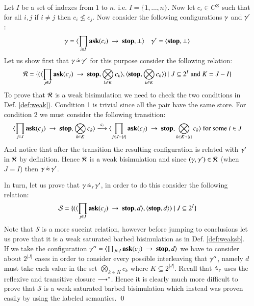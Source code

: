 \documentclass[main.tex]{subfiles}
\begin{document}
\begin{example}
\label{ex:barbvslabbis2}
Let $I$ be a set of indexes from $1$ to $n$, i.e. $I = \{1,\dots,n\}$. Now let $c_i \in C^\otimes$ such that
for all $i, j$ if $i \neq j$ then $c_i \not\leq c_j$. Now consider the following configurations $\gamma$ and $\gamma'$:
\[
\gamma = \langle \prod_{i \in I} {\bf ask}(c_i) \ \rightarrow \ \mbox{{\bf stop}},\bot \rangle \ \ \ \ \gamma' = \langle \mbox{{\bf stop}},\bot \rangle
\]
Let us show first that $\gamma\,\dot{\approx}\,\gamma'$ for this purpose consider the following relation:
\[
\mathcal{R} = \{ (\langle \prod_{j \in J} {\bf ask}(c_j) \ \rightarrow \ \mbox{{\bf stop}},\bigotimes_{k \in K} c_k \rangle, \langle \mbox{{\bf stop}},\bigotimes_{k \in K} c_k \rangle) 
\ |\  J \subseteq 2^I \mbox{ and } K = J - I\}
\]
To prove that $\mathcal{R}$ is a weak bisimulation we need to check the two conditions in Def. \ref{def:weak}). Condition 1 is trivial
since all the pair have the same store. For condition 2 we must consider the following transition:
\[
 \langle \prod_{j \in J} {\bf ask}(c_j) \ \rightarrow \ \mbox{{\bf stop}},\bigotimes_{k \in K} c_k \rangle \stackrel{c_i}{\longrightarrow} 
 \langle \prod_{j \in J-\{i\}} {\bf ask}(c_j) \ \rightarrow \ \mbox{{\bf stop}},\bigotimes_{k \in K+\{i\}} c_k \rangle \mbox{ for some } i \in J
\]
And notice that after the transition the resulting configuration is related with $\gamma'$ in $\mathcal{R}$ by definition. 
Hence $\mathcal{R}$ is a weak bisimulation and since $(\gamma, \gamma') \in \mathcal{R}$ (when $J = I$) then $\gamma\,\dot{\approx}\,\gamma'$.

In turn, let us prove that $\gamma\,\dot{\approx}_{s}\,\gamma'$, in order to do this consider the following relation:
\[
\mathcal{S} = \{ (\langle \prod_{j \in J} {\bf ask}(c_j) \ \rightarrow \ \mbox{{\bf stop}},d \rangle, \langle \mbox{{\bf stop}},d \rangle) \ |\  J \subseteq 2^I\}
\]
Note that $\mathcal{S}$ is a more succint relation, however before jumping to conclusions
let us prove that it is a weak saturated barbed bisimulation as in Def. \ref{def:weaksb}.
If we take the configuration $\gamma'' = \langle \prod_{j \in J} {\bf ask}(c_j) \ \rightarrow \ \mbox{{\bf stop}},d \rangle$ we have to consider about $2^{|J|}$
cases in order to consider every possible interleaving that $\gamma''$,
namely $d$ must take each value in the set $\bigotimes_{k \in K} c_k$ 
where $K \subseteq 2^{|J|}$. Recall that $\dot{\approx}_{s}$ uses the reflexive and transitive closure $\longrightarrow^*$.
Hence it is clearly much more difficult to prove that $\mathcal{S}$ is a weak saturated 
barbed bisimulation which instead was proven easily by using the labeled semantics.
\qed
\end{example}
\end{document}
